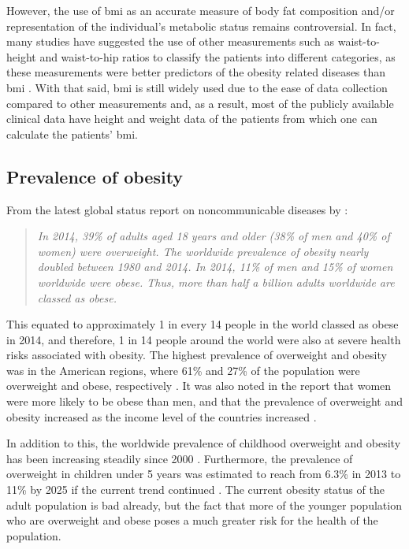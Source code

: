 However, the use of \gls{bmi} as an accurate measure of body fat composition and/or representation of the individual's metabolic status remains controversial.
In fact, many studies have suggested the use of other measurements such as waist-to-height and waist-to-hip ratios to classify the patients into different categories, as these measurements were better predictors of the obesity related diseases than \gls{bmi} \citep{Dalton2003,Gelber2008,Lee2008}.
With that said, \gls{bmi} is still widely used due to the ease of data collection compared to other measurements and, as a result, most of the publicly available clinical data have  height and weight data of the patients from which one can calculate the patients' \gls{bmi}.

\subsection{Prevalence of obesity}
\label{sub:prevalence_of_obesity}

From the latest global status report on noncommunicable diseases by \citet{WHO2014}:
\begin{quote}
	\textit{
		In 2014, 39\% of adults aged 18 years and older (38\% of men and 40\% of women) were overweight.
		The worldwide prevalence of obesity nearly doubled between 1980 and 2014.
		In 2014, 11\% of men and 15\% of women worldwide were obese.
		Thus, more than half a billion adults worldwide are classed as obese.
	}
\end{quote}

\noindent
This equated to approximately 1 in every 14 people in the world classed as obese in 2014, and therefore, 1 in 14 people around the world were also at severe health risks associated with obesity.
The highest prevalence of overweight and obesity was in the American regions, where 61\% and 27\% of the population were overweight and obese, respectively \citep{WHO2014}.
It was also noted in the report that women were more likely to be obese than men, and that the prevalence of overweight and obesity increased as the income level of the countries increased \citep{WHO2014}.

In addition to this, the worldwide prevalence of childhood overweight and obesity has been increasing steadily since 2000 \citep{WHO2014}.
Furthermore, the prevalence of overweight in children under 5 years was estimated to reach from 6.3\% in 2013 to 11\% by 2025 if the current trend continued \citep{WHO2014}.
The current obesity status of the adult population is bad already, but the fact that more of the younger population who are overweight and obese poses a much greater risk for the health of the population.

